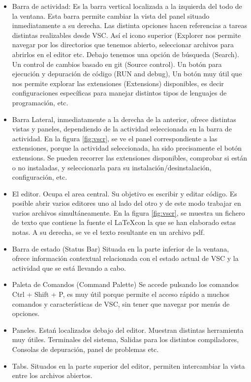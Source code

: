 \documentclass[10pt,a4paper]{report}
\begin{document}
\begin{itemize}
	\item Barra de actividad: Es la barra vertical localizada a la izquierda del todo de la ventana. Esta barra permite cambiar la vista del panel situado inmediatamente a su derecha. Las distinta opciones hacen referencias a tareas distintas realizables desde VSC. Así el icono superior (Explorer nos permite navegar por los directorios que tenemos abierto, seleccionar archivos para abrirlos en el editor etc. Debajo tenemos una opción de búsqueda (Search). Un control de cambios basado en git (Source control). Un botón para ejecución y depuración de código (RUN and debug), Un botón muy útil que nos permite explorar las extensiones (Extensions) disponibles, es decir configuraciones específicas para manejar distintos tipos de lenguajes de programación, etc.
	\item Barra Lateral, inmediatamente a la derecha de la anterior, ofrece distintas vistas y paneles, dependiendo de la actividad seleccionada en la barra de actividad. En la figura \ref{fig:vscr}, se ve el panel correspondiente a las extensiones, porque la actividad seleccionada, ha sido precisamente el botón extensions. Se pueden recorrer las extensiones disponibles, comprobar si están o no instaladas, y seleccionarla para su instalación/desinstalación, configuración, etc.
	\item El editor. Ocupa el area central. Su objetivo es escribir y editar código. Es posible abrir varios editores uno al lado del otro y de este modo trabajar en varios archivos simultáneamente. En la figura \ref{fig:vscr}, se muestra un fichero de texto que contiene la fuente el \LaTeX con la que se han elaborado estas notas. A su derecha, se ve el texto resultante en un archivo pdf.
	\item Barra de estado (Status Bar) Situada en la parte inferior de la ventana, ofrece información contextual relacionada con el estado actual de VSC y la actividad que se está llevando a cabo.
	\item Paleta de Comandos (Command Palette) Se accede pulsando los comandos Ctrl + Shift + P, es muy útil porque permite el acceso rápido a muchos comandos y características de VSC, sin tener que navegar por menús de opciones.
	\item Paneles. Estań localizados debajo del editor. Muestran distintas herramienta muy útiles. Terminales del sistema, Salidas para los distintos compiladores, Consolas de depuración, panel de problemas etc.
	\item Tabs. Situados en la parte superior del editor, permiten intercambiar la vista entre los archivos abiertos.  
\end{itemize}
\end{document}
